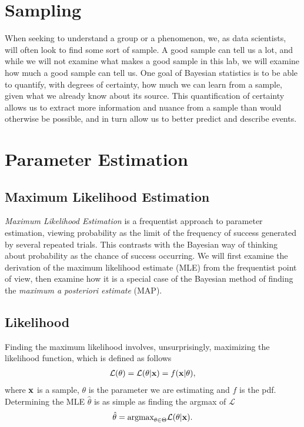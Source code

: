 \label{lab:Sampling}

\section*{Sampling}
When seeking to understand a group or a phenomenon, we, as data scientists, will often look to find some sort of sample.
A good sample can tell us a lot, and while we will not examine what makes a good sample in this lab, we will examine how much a good sample can tell us.
One goal of Bayesian statistics is to be able to quantify, with degrees of certainty, how much we can learn from a sample, given what we already know about its source.
This quantification of certainty allows us to extract more information and nuance from a sample than would otherwise be possible, and in turn allow us to better predict and describe events.

\section*{Parameter Estimation}
\subsection*{Maximum Likelihood Estimation}
\emph{Maximum Likelihood Estimation} is a frequentist approach to parameter estimation, viewing probability as the limit of the frequency of success generated by several repeated trials. This contrasts with the Bayesian way of thinking about probability as the chance of success occurring. We will first examine the derivation of the maximum likelihood estimate (MLE) from the frequentist point of view, then examine how it is a special case of the Bayesian method of finding the \emph{maximum a posteriori estimate} (MAP).

\subsection*{Likelihood}
Finding the maximum likelihood involves, unsurprisingly, maximizing the likelihood function, which is defined as follows
\begin{align*}
  \mathcal{L}(\theta) = \mathcal{L}(\theta | \mathbf{x}) = f(\mathbf{x} | \theta),
\end{align*}
where $\mathbf{x}$ is a sample, $\theta$ is the parameter we are estimating and $f$ is the pdf.
Determining the MLE $\hat{\theta}$ is as simple as finding the argmax of $\mathcal{L}$
\begin{align*}
  \hat{\theta} = \mbox{argmax}_{\theta \in \Theta} \mathcal{L}(\theta | \mathbf{x}).
\end{align*}

